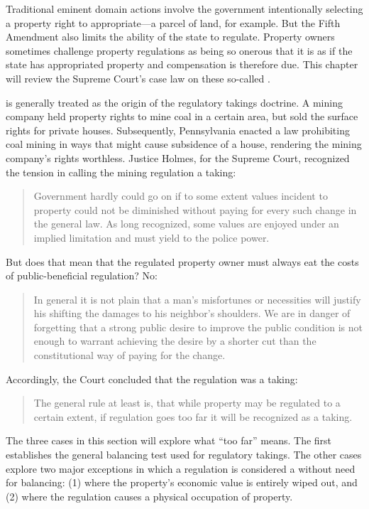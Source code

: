 Traditional eminent domain actions involve the government intentionally
selecting a property right to appropriate---a parcel of land, for example. But
the Fifth Amendment also limits the ability of the state to regulate. Property
owners sometimes challenge property regulations as being so onerous that it is
as if the state has appropriated property and compensation is therefore due.
This chapter will review the Supreme Court's case law on these so-called
.


 is generally treated as the origin of the regulatory takings
doctrine. A mining company held property rights to mine coal in a certain area,
but sold the surface rights for private houses. Subsequently, Pennsylvania
enacted a law prohibiting coal mining in ways that might cause subsidence of a
house, rendering the mining company's rights worthless. Justice Holmes, for the
Supreme Court, recognized the tension in calling the mining regulation a taking:
\begin{quote}
Government hardly could go on if to some extent values incident to property
could not be diminished without paying for every such change in the general law.
As long recognized, some values are enjoyed under an implied limitation and must
yield to the police power.
\end{quote}
But does that mean that the regulated property owner must always eat the costs
of public-beneficial regulation? No:
\begin{quote}
In general it is not plain that a man's misfortunes or necessities will justify
his shifting the damages to his neighbor's shoulders. We are in danger of
forgetting that a strong public desire to improve the public condition is not
enough to warrant achieving the desire by a shorter cut than the constitutional
way of paying for the change.
\end{quote}
Accordingly, the Court concluded that the regulation was a taking:
\begin{quote}
The general rule at least is, that while property may be regulated to a certain
extent, if regulation goes too far it will be recognized as a taking.
\end{quote}
The three cases in this section will explore what ``too far'' means. The first
establishes the general balancing test used for regulatory takings. The other
cases explore two major exceptions in which a regulation is considered a
 without need for balancing: (1) where the property's economic value is
entirely wiped out, and (2) where the regulation causes a physical occupation of
property.

